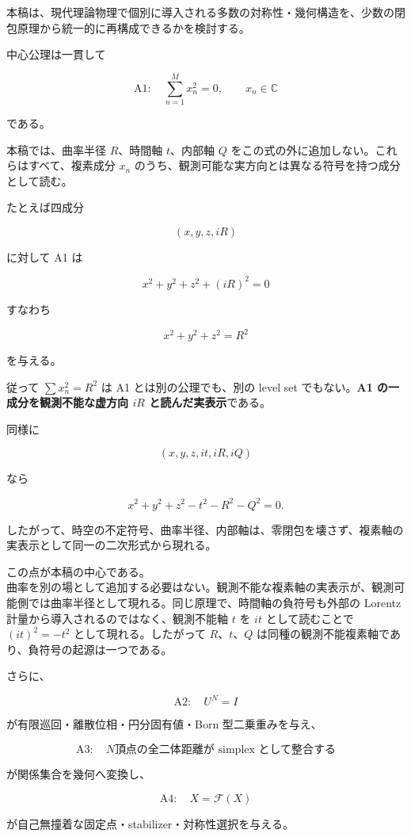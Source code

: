 \documentclass[
  a4paper,
]{ltjsarticle}
\begin{document}
本稿は、現代理論物理で個別に導入される多数の対称性・幾何構造を、少数の閉包原理から統一的に再構成できるかを検討する。

中心公理は一貫して

\[
\boxed{
\mathrm{A1}:\quad
\sum_{n=1}^{M} x_n^2=0,
\qquad x_n\in\mathbb C
}
\]

である。

本稿では、曲率半径 \(R\)、時間軸 \(t\)、内部軸 \(Q\)
をこの式の外に追加しない。これらはすべて、複素成分 \(x_n\)
のうち、観測可能な実方向とは異なる符号を持つ成分として読む。

たとえば四成分

\[
(x,y,z,iR)
\]

に対して A1 は

\[
x^2+y^2+z^2+(iR)^2=0
\]

すなわち

\[
\boxed{
x^2+y^2+z^2=R^2
}
\]

を与える。

従って \(\sum x_n^2=R^2\) は A1 とは別の公理でも、別の level set
でもない。\textbf{A1 の一成分を観測不能な虚方向 \(iR\)
と読んだ実表示}である。

同様に

\[
(x,y,z,it,iR,iQ)
\]

なら

\[
x^2+y^2+z^2-t^2-R^2-Q^2=0.
\]

したがって、時空の不定符号、曲率半径、内部軸は、零閉包を壊さず、複素軸の実表示として同一の二次形式から現れる。

この点が本稿の中心である。\\
曲率を別の場として追加する必要はない。観測不能な複素軸の実表示が、観測可能側では曲率半径として現れる。同じ原理で、時間軸の負符号も外部の
Lorentz 計量から導入されるのではなく、観測不能軸 \(t\) を \(it\)
として読むことで \((it)^2=-t^2\) として現れる。したがって
\(R\)、\(t\)、\(Q\)
は同種の観測不能複素軸であり、負符号の起源は一つである。

さらに、

\[
\boxed{
\mathrm{A2}:\quad U^N=I
}
\]

が有限巡回・離散位相・円分固有値・Born 型二乗重みを与え、

\[
\boxed{
\mathrm{A3}:\quad
N\text{頂点の全二体距離が simplex として整合する}
}
\]

が関係集合を幾何へ変換し、

\[
\boxed{
\mathrm{A4}:\quad X=\mathcal F(X)
}
\]

が自己無撞着な固定点・stabilizer・対称性選択を与える。
\end{document}
